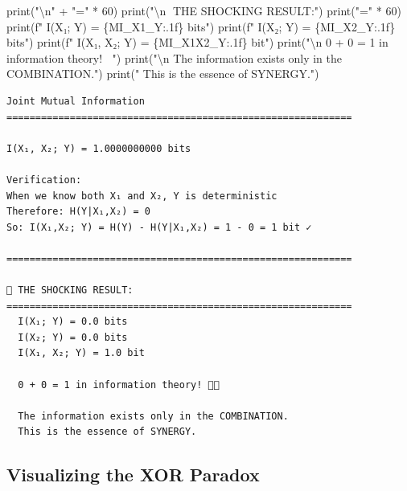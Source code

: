 \documentclass[
  11pt,
  letterpaper,
  oneside,
  openany]{book}
\newenvironment{Shaded}{\begin{snugshade}}{\end{snugshade}}
\newcommand{\BuiltInTok}[1]{\textcolor[rgb]{0.00,0.23,0.31}{#1}}
\newcommand{\CharTok}[1]{\textcolor[rgb]{0.13,0.47,0.30}{#1}}
\newcommand{\DecValTok}[1]{\textcolor[rgb]{0.68,0.00,0.00}{#1}}
\newcommand{\NormalTok}[1]{\textcolor[rgb]{0.00,0.23,0.31}{#1}}
\newcommand{\OperatorTok}[1]{\textcolor[rgb]{0.37,0.37,0.37}{#1}}
\newcommand{\SpecialCharTok}[1]{\textcolor[rgb]{0.37,0.37,0.37}{#1}}
\newcommand{\SpecialStringTok}[1]{\textcolor[rgb]{0.13,0.47,0.30}{#1}}
\newcommand{\StringTok}[1]{\textcolor[rgb]{0.13,0.47,0.30}{#1}}
\begin{document}
\begin{Shaded}
\begin{Highlighting}[]
\BuiltInTok{print}\NormalTok{(}\StringTok{"}\CharTok{\textbackslash{}n}\StringTok{"} \OperatorTok{+} \StringTok{"="} \OperatorTok{*} \DecValTok{60}\NormalTok{)}
\BuiltInTok{print}\NormalTok{(}\StringTok{"}\CharTok{\textbackslash{}n}\StringTok{🤯 THE SHOCKING RESULT:"}\NormalTok{)}
\BuiltInTok{print}\NormalTok{(}\StringTok{"="} \OperatorTok{*} \DecValTok{60}\NormalTok{)}
\BuiltInTok{print}\NormalTok{(}\SpecialStringTok{f"  I(X₁; Y) = }\SpecialCharTok{\{}\NormalTok{MI\_X1\_Y}\SpecialCharTok{:.1f\}}\SpecialStringTok{ bits"}\NormalTok{)}
\BuiltInTok{print}\NormalTok{(}\SpecialStringTok{f"  I(X₂; Y) = }\SpecialCharTok{\{}\NormalTok{MI\_X2\_Y}\SpecialCharTok{:.1f\}}\SpecialStringTok{ bits"}\NormalTok{)}
\BuiltInTok{print}\NormalTok{(}\SpecialStringTok{f"  I(X₁, X₂; Y) = }\SpecialCharTok{\{}\NormalTok{MI\_X1X2\_Y}\SpecialCharTok{:.1f\}}\SpecialStringTok{ bit"}\NormalTok{)}
\BuiltInTok{print}\NormalTok{(}\StringTok{"}\CharTok{\textbackslash{}n}\StringTok{  0 + 0 = 1 in information theory! 🎩✨"}\NormalTok{)}
\BuiltInTok{print}\NormalTok{(}\StringTok{"}\CharTok{\textbackslash{}n}\StringTok{  The information exists only in the COMBINATION."}\NormalTok{)}
\BuiltInTok{print}\NormalTok{(}\StringTok{"  This is the essence of SYNERGY."}\NormalTok{)}
\end{Highlighting}
\end{Shaded}

\begin{verbatim}
Joint Mutual Information
============================================================

I(X₁, X₂; Y) = 1.0000000000 bits

Verification:
When we know both X₁ and X₂, Y is deterministic
Therefore: H(Y|X₁,X₂) = 0
So: I(X₁,X₂; Y) = H(Y) - H(Y|X₁,X₂) = 1 - 0 = 1 bit ✓

============================================================

🤯 THE SHOCKING RESULT:
============================================================
  I(X₁; Y) = 0.0 bits
  I(X₂; Y) = 0.0 bits
  I(X₁, X₂; Y) = 1.0 bit

  0 + 0 = 1 in information theory! 🎩✨

  The information exists only in the COMBINATION.
  This is the essence of SYNERGY.
\end{verbatim}

\subsection{Visualizing the XOR
Paradox}\label{visualizing-the-xor-paradox}
\end{document}
